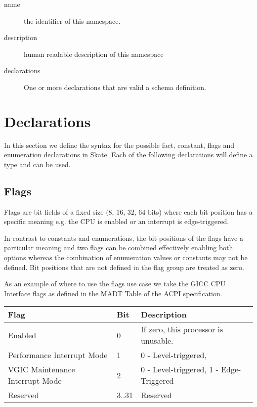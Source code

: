 \documentclass[a4paper,11pt,twoside]{report}
\begin{document}
{{\begin{description}
    \item[name] the identifier of this namespace.
    
    \item[description] human readable description of this namespace
    
    \item[declarations] One or more declarations that are valid a schema 
    definition.
\end{description}



\section{Declarations}\label{sec:decl:decls}

In this section we define the syntax for the possible fact, constant, flags
and enumeration declarations in Skate. Each of the following declarations will
define a type and can be used.

\subsection{Flags}
\label{sec:decl:flags}

Flags are bit fields of a fixed size (8, 16, 32, 64 bits) where each bit 
position has a specific meaning e.g. the CPU is enabled or an interrupt
is edge-triggered. 

In contrast to constants and enumerations, the bit positions of the flags have 
a particular meaning and two flags can be combined effectively enabling both
options whereas the combination of enumeration values or constants may not be 
defined. Bit positions that are not defined in the flag group are treated as 
zero.

As an example of where to use the flags use case we take the GICC CPU Interface 
flags as defined in the MADT Table of the ACPI specification.


\begin{tabular}{lll}
    \textbf{Flag}      & \textbf{Bit} & \textbf{Description} \\
    \hline
    Enabled   & 0   & If zero, this processor is unusable.\\
    Performance Interrupt Mode & 1 &  0 - Level-triggered,\\
    VGIC Maintenance Interrupt Mode & 2 & 0 - Level-triggered, 1 - 
    Edge-Triggered \\
    Reserved & 3..31 & Reserved \\
    \hline
\end{tabular}



}}
\end{document}
